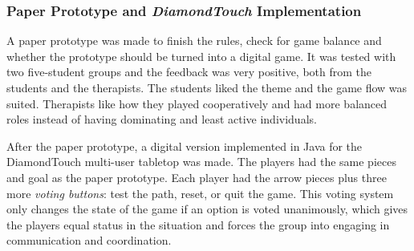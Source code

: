 \documentclass[runningheads]{llncs}
\begin{document}
\subsubsection{Paper Prototype and \textit{DiamondTouch} Implementation}
\par A paper prototype was made to finish the rules, check for game balance and whether the prototype should be turned into a digital game. It was tested with two five-student groups and the feedback was very positive, both from the students and the therapists. The students liked the theme and the game flow was suited. Therapists like how they played cooperatively and had more balanced roles instead of having dominating and least active individuals.
\par After the paper prototype, a digital version implemented in Java for the DiamondTouch multi-user tabletop was made. The players had the same pieces and goal as the paper prototype. Each player had the arrow pieces plus three more \textit{voting buttons}: test the path, reset, or quit the game. This voting system only changes the state of the game if an option is voted unanimously, which gives the players equal status in the situation and forces the group into engaging in communication and coordination.
\end{document}
